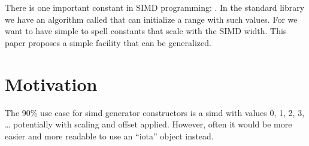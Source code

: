 \newcommand\wgTitle{Add an iota object for simd (and more)}
\newcommand\wgName{Matthias Kretz <m.kretz@gsi.de>}
\newcommand\wgDocumentNumber{P3319R0}
\newcommand\wgGroup{LEWG}
\newcommand\wgTarget{\CC{}26}

\usepackage{mymacros}
\usepackage{wg21}
\setcounter{tocdepth}{2} %
\hypersetup{bookmarksdepth=5}
\usepackage{changelog}
\usepackage{underscore}
\usepackage{multirow}



\newcommand\simd[1][]{\type{ba\-sic\_simd#1}\xspace}
\newcommand\simdT{\type{ba\-sic\_simd\MayBreak<\MayBreak{}T>}\xspace}
\newcommand\valuetype{\type{val\-ue\_type}\xspace}
\newcommand\referencetype{\type{ref\-er\-ence}\xspace}
\newcommand\mask[1][]{\type{ba\-sic\_simd\_mask#1}\xspace}
\newcommand\maskT{\type{ba\-sic\_simd\_mask\MayBreak<\MayBreak{}T>}\xspace}
\newcommand\wglink[1]{\href{https://wg21.link/#1}{#1}}

\newcommand\nativeabi{\UNSP{native-abi}}
\newcommand\deducet{\UNSP{deduce-t}}
\newcommand\simdsizev{\UNSP{simd-size-v}}
\newcommand\simdsizetype{\UNSP{simd-size-type}}
\newcommand\simdselect{\UNSP{simd-select-impl}}
\newcommand\maskelementsize{\UNSP{mask-element-size}}
\newcommand\integerfrom{\UNSP{integer-from}}
\newcommand\constexprwrapperlike{\UNSP{constexpr-wrapper-like}}

\renewcommand{\lst}[1]{Listing~\ref{#1}}
\renewcommand{\sect}[1]{Section~\ref{#1}}
\renewcommand{\ttref}[1]{Tony~Table~\ref{#1}}
\renewcommand{\tabref}[1]{Table~\ref{#1}}


\begin{wgTitlepage}
  There is one important constant in SIMD programming: . In the standard library we have an algorithm called  that
  can initialize a range with such values. For  we want to have
  simple to spell constants that scale with the SIMD width. This paper proposes
  a simple facility that can be generalized.
\end{wgTitlepage}

\pagestyle{scrheadings}




\section{Motivation}
The 90\% use case for simd generator constructors is a simd with values 0, 1,
2, 3, \ldots{} potentially with scaling and offset applied.
However, often it would be more easier and more readable to use an “iota”
 object instead.

